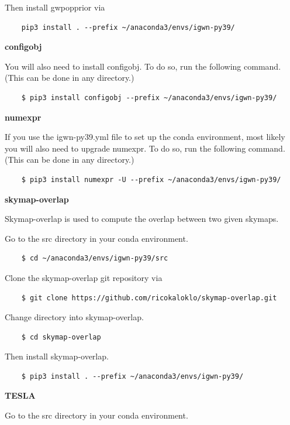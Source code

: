 Then install gwpopprior via

\begin{verbatim}
    pip3 install . --prefix ~/anaconda3/envs/igwn-py39/
\end{verbatim}

\textbf{configobj}

You will also need to install configobj. To do so, run the following command. (This can be done in any directory.)

\begin{verbatim}
    $ pip3 install configobj --prefix ~/anaconda3/envs/igwn-py39/
\end{verbatim}

\textbf{numexpr}

If you use the igwn-py39.yml file to set up the conda environment, most likely you will also need to upgrade numexpr. To do so, run the following command. (This can be done in any directory.)

\begin{verbatim}
    $ pip3 install numexpr -U --prefix ~/anaconda3/envs/igwn-py39/
\end{verbatim}

\textbf{skymap-overlap}

Skymap-overlap is used to compute the overlap between two given skymaps.

Go to the src directory in your conda environment.

\begin{verbatim}
    $ cd ~/anaconda3/envs/igwn-py39/src
\end{verbatim}

Clone the skymap-overlap git repository via

\begin{verbatim}
    $ git clone https://github.com/ricokaloklo/skymap-overlap.git
\end{verbatim}

Change directory into skymap-overlap.

\begin{verbatim}
    $ cd skymap-overlap
\end{verbatim}

Then install skymap-overlap.

\begin{verbatim}
    $ pip3 install . --prefix ~/anaconda3/envs/igwn-py39/
\end{verbatim}

\textbf{TESLA}

Go to the src directory in your conda environment.

